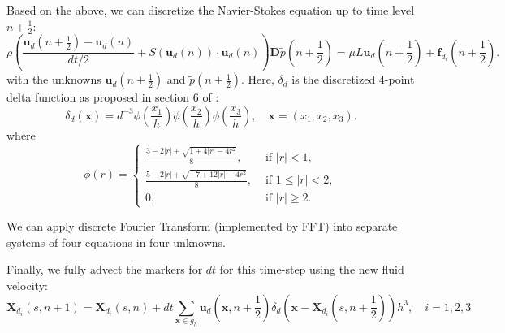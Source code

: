 \documentclass{jfm}
\begin{document}
Based on the above, we can discretize the Navier-Stokes equation up to time level $n+\frac{1}{2}$:
\begin{equation}
    \rho\left(\frac{\bm{u}_d(n+\frac{1}{2})-\bm{u}_d(n)}{dt/2}+S(\bm{u}_d(n))\cdot\bm{u}_d(n)\right)\bm{D}\tilde{p}(n+\frac{1}{2})=\mu L\bm{u}_d(n+\frac{1}{2})+\bm{f}_{d_i}(n+\frac{1}{2}). 
\end{equation}
with the unknowns $\bm{u}_d(n+\frac{1}{2})$ and $\tilde{p}(n+\frac{1}{2})$. Here, $\delta_d$ is the discretized 4-point delta function as proposed in section 6 of \cite{peskin2002immersed}: 
\begin{equation}
    \delta_d(\bm{x}) = d^{-3}\phi\left(\frac{x_1}{h}\right)\phi\left(\frac{x_2}{h}\right)\phi\left(\frac{x_3}{h}\right), \quad\bm{x}=(x_1,x_2,x_3). 
\end{equation}
where
\begin{equation}
    \phi(r) = \begin{cases}
        \frac{3-2|r|+\sqrt{1+4|r|-4r^2}}{8}, &\text{ if }|r|<1,\\
        \frac{5-2|r|+\sqrt{-7+12|r|-4r^2}}{8}, &\text{ if }1\leq|r|<2,\\
        0, &\text{ if }|r|\ge2.
    \end{cases}
\end{equation}

We can apply discrete Fourier Transform (implemented by FFT) into separate systems of four equations in four unknowns.

Finally, we fully advect the markers for $dt$ for this time-step using the new fluid velocity: 
\begin{equation}
\bm{X}_{d_i}(s, n+1) = \bm{X}_{d_i}(s, n) + dt \sum_{\bm{x}\in g_h} \bm{u}_d(\bm{x}, n+\frac{1}{2})\delta_d\left(\bm{x}-\bm{X}_{d_i}(s, n+\frac{1}{2})\right) h^3, \quad i = 1,2,3 \label{eq:advect}
\end{equation}
\end{document}
